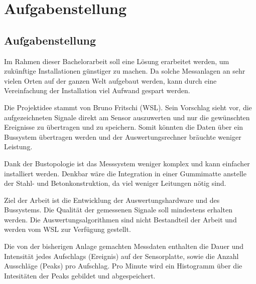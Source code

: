 %
%

\chapter{Aufgabenstellung}\label{chap.aufgabenstellung}



\section{Aufgabenstellung}\label{sec.aufgabenstellung}
Im Rahmen dieser Bachelorarbeit soll eine Lösung erarbeitet werden, um zukünftige Installationen günstiger zu machen. Da solche Messanlagen an sehr vielen Orten auf der ganzen Welt aufgebaut werden, kann durch eine Vereinfachung der Installation viel Aufwand gespart werden. 

Die Projektidee stammt von Bruno Fritschi (WSL). Sein Vorschlag sieht vor, die aufgezeichneten Signale direkt am Sensor auszuwerten und nur die gewünschten Ereignisse zu übertragen und zu speichern. Somit könnten die Daten über ein Bussystem übertragen werden und der Auswertungsrechner bräuchte weniger Leistung.

Dank der Bustopologie ist das Messsystem weniger komplex und kann einfacher installiert werden. Denkbar wäre die Integration in einer Gummimatte anstelle der Stahl- und Betonkonstruktion, da viel weniger Leitungen nötig sind.

Ziel der Arbeit ist die Entwicklung der Auswertungshardware und des Bussystems. Die Qualität der gemessenen Signale soll mindestens erhalten werden. Die Auswertungsalgorithmen sind nicht Bestandteil der Arbeit und werden vom WSL zur Verfügung gestellt.

Die von der bisherigen Anlage gemachten Messdaten enthalten die Dauer und Intensität jedes Aufschlags (Ereignis) auf der Sensorplatte, sowie die Anzahl Ausschläge (Peaks) pro Aufschlag. Pro Minute wird ein Histogramm über die Intesitäten der Peaks gebildet und abgespeichert.

